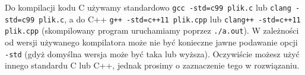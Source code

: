 % 
% 
% 
% 

Do kompilacji kodu C używamy standardowo \Verb#gcc -std=c99 plik.c# lub \Verb#clang -std=c99 plik.c#, a do C++ \Verb#g++ -std=c++11 plik.cpp# lub \Verb#clang++ -std=c++11 plik.cpp# (skompilowany program uruchamiamy poprzez \Verb#./a.out#).
W zależności od wersji używanego kompilatora może nie być konieczne jawne podawanie opcji \Verb#-std# (gdyż domyślna wersja może być taka lub wyższa).
Oczywiście możesz użyć innego standardu C lub C++, jednak prosimy o zaznaczenie tego w rozwiązaniu.
